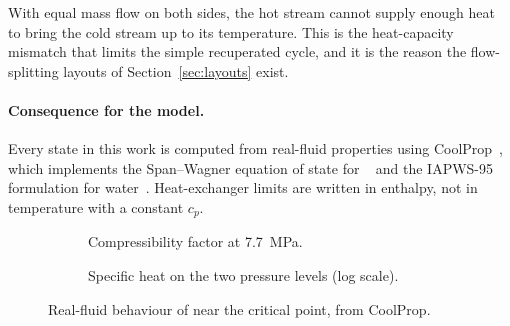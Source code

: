 With equal mass flow on both sides, the hot stream cannot supply enough heat to bring the cold stream up to its temperature. This is the heat-capacity mismatch that limits the simple recuperated cycle, and it is the reason the flow-splitting layouts of Section~\ref{sec:layouts} exist.

\paragraph{Consequence for the model.} Every state in this work is computed from real-fluid properties using CoolProp~\cite{coolprop}, which implements the Span--Wagner equation of state for \cotwo~\cite{spanwagner} and the IAPWS-95 formulation for water~\cite{iapws}. Heat-exchanger limits are written in enthalpy, not in temperature with a constant $c_p$.

\begin{figure}[h]
\centering
\begin{subfigure}{0.48\textwidth}
\centering
{}
\caption{Compressibility factor at \SI{7.7}{MPa}.}\label{fig:z}
\end{subfigure}\hfill
\begin{subfigure}{0.48\textwidth}
\centering
{}
\caption{Specific heat on the two pressure levels (log scale).}\label{fig:cp}
\end{subfigure}
\caption{Real-fluid behaviour of \cotwo{} near the critical point, from CoolProp.}
\end{figure}
